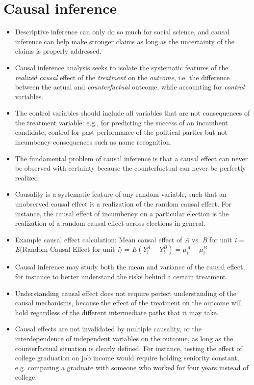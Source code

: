 \documentclass[11pt,letterpaper]{article}
\begin{document}
\section{Causal inference}

\begin{itemize}
\item Descriptive inference can only do so much for social science, and causal inference can help make stronger claims as long as the uncertainty of the claims is properly addressed.
\item Causal inference analysis seeks to isolate the systematic features of the \emph{realized causal} effect of the \emph{treatment} on the \emph{outcome}, i.e. the difference between the actual and \emph{counterfactual} outcome, while accounting for \emph{control} variables.
\item The control variables should include all variables that are not consequences of the treatment variable: e.g., for predicting the success of an incumbent candidate, control for past performance of the political parties but not incumbency consequences such as name recognition.
\item The fundamental problem of causal inference is that a causal effect can never be observed with certainty because the counterfactual can never be perfectly realized.
\item Causality is a systematic feature of any random variable, such that an unobserved causal effect is a realization of the random causal effect. For instance, the causal effect of incumbency on a particular election is the realization of a random causal effect across elections in general.
\item Example causal effect calculation: Mean causal effect of \emph{A} vs. \emph{B} for unit \emph{i} = \emph{E}(Random Causal Effect for unit \emph{i}) = $ E(Y^{A}_{i} - Y^{B}_{i}) = \mu^{A}_{i} - \mu^{B}_{i} $
\item Causal inference may study both the mean and variance of the causal effect, for instance to better understand the risks behind a certain treatment.
\item Understanding causal effect does not require perfect understanding of the causal mechanisms, because the effect of the treatment on the outcome will hold regardless of the different intermediate paths that it may take.
\item Causal effects are not invalidated by multiple causality, or the interdependence of independent variables on the outcome, as long as the counterfactual situation is clearly defined. For instance, testing the effect of college graduation on job income would require holding seniority constant, e.g. comparing a graduate with someone who worked for four years instead of college.

\end{itemize}
\end{document}
